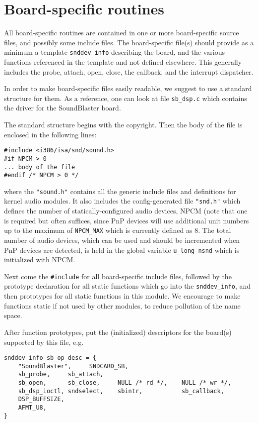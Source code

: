 \documentclass[11pt]{article}
\begin{document}
\section{Board-specific routines}

All board-specific routines are contained in one or more board-specific
source files, and possibly some include files.  The board-specific
file(s) should provide as a minimum a template {\tt snddev\_info}
describing the board, and the various functions referenced in the
template and not defined elsewhere. This generally includes the
probe, attach, open, close, the callback, and the interrupt
dispatcher.

In order to make board-specific files easily readable, we suggest
to use a standard structure for them.  As a reference, one can
look at file {\tt sb\_dsp.c} which contains the driver for the
SoundBlaster board.

The standard structure begins with the copyright. Then the body of the
file is enclosed in the following lines:
\begin{verbatim}
#include <i386/isa/snd/sound.h>
#if NPCM > 0
... body of the file
#endif /* NPCM > 0 */
\end{verbatim}
where the {\tt "sound.h"} contains all the generic include files and
definitions for kernel audio modules. It also includes the
config-generated file {\tt "snd.h"} which defines the number of
statically-configured audio devices, NPCM (note that one is required
but often suffices, since PnP devices will use additional unit numbers
up to the maximum of {\tt NPCM\_MAX} which is currently defined as 8.
The total number of audio devices, which can be used and should be
incremented when PnP devices are detected, is held in the global
variable {\tt u\_long nsnd} which is initialized with NPCM.

Next come the {\tt \#include} for all board-specific include files,
followed by the prototype declaration for all static functions which go
into the {\tt snddev\_info}, and then prototypes for all static
functions in this module. We encourage to make functions static if not
used by other modules, to reduce pollution of the name space.

After function prototypes, put the (initialized) descriptors for the
board(s) supported by this file, e.g.
\begin{verbatim}
snddev_info sb_op_desc = {
    "SoundBlaster",     SNDCARD_SB,
    sb_probe,     sb_attach,
    sb_open,      sb_close,     NULL /* rd */,    NULL /* wr */,
    sb_dsp_ioctl, sndselect,    sbintr,           sb_callback,
    DSP_BUFFSIZE,
    AFMT_U8,
}
\end{verbatim}
\end{document}
